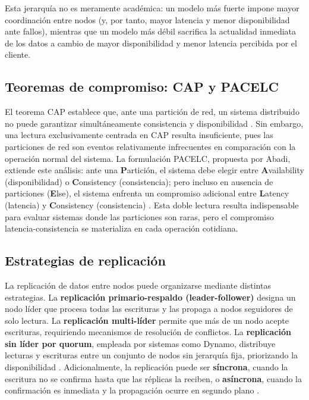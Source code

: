 \documentclass[12pt, a4paper]{article}
\begin{document}
Esta jerarquía no es meramente académica: un modelo más fuerte impone mayor coordinación entre nodos (y, por tanto, mayor latencia y menor disponibilidad ante fallos), mientras que un modelo más débil sacrifica la actualidad inmediata de los datos a cambio de mayor disponibilidad y menor latencia percibida por el cliente.

\subsection{Teoremas de compromiso: CAP y PACELC}
El teorema CAP establece que, ante una partición de red, un sistema distribuido no puede garantizar simultáneamente consistencia y disponibilidad \cite{gilbertlynch2002}. Sin embargo, una lectura exclusivamente centrada en CAP resulta insuficiente, pues las particiones de red son eventos relativamente infrecuentes en comparación con la operación normal del sistema. La formulación PACELC, propuesta por Abadi, extiende este análisis: ante una \textbf{P}artición, el sistema debe elegir entre \textbf{A}vailability (disponibilidad) o \textbf{C}onsistency (consistencia); pero incluso en ausencia de particiones (\textbf{E}lse), el sistema enfrenta un compromiso adicional entre \textbf{L}atency (latencia) y \textbf{C}onsistency (consistencia) \cite{abadi2012}. Esta doble lectura resulta indispensable para evaluar sistemas donde las particiones son raras, pero el compromiso latencia-consistencia se materializa en cada operación cotidiana.

\subsection{Estrategias de replicación}
La replicación de datos entre nodos puede organizarse mediante distintas estrategias. La \textbf{replicación primario-respaldo (leader-follower)} designa un nodo líder que procesa todas las escrituras y las propaga a nodos seguidores de solo lectura. La \textbf{replicación multi-líder} permite que más de un nodo acepte escrituras, requiriendo mecanismos de resolución de conflictos. La \textbf{replicación sin líder por quorum}, empleada por sistemas como Dynamo, distribuye lecturas y escrituras entre un conjunto de nodos sin jerarquía fija, priorizando la disponibilidad \cite{decandia2007}. Adicionalmente, la replicación puede ser \textbf{síncrona}, cuando la escritura no se confirma hasta que las réplicas la reciben, o \textbf{asíncrona}, cuando la confirmación es inmediata y la propagación ocurre en segundo plano \cite{vansteen2017}.
\end{document}
